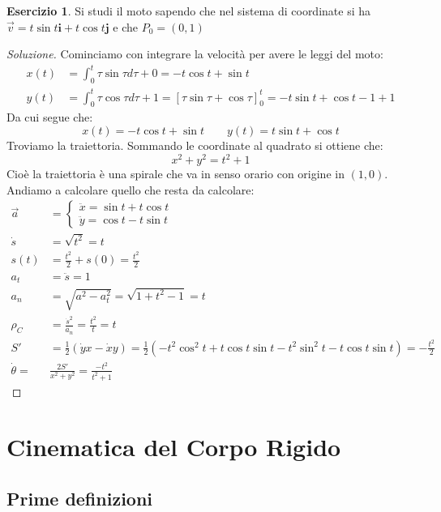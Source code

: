 \documentclass[11pt,a4paper,twoside]{article}
\theoremstyle{definition}
\newtheorem{ese}{Esercizio}[section]
\newenvironment{sol}
	{\renewcommand\qedsymbol{$\blacksquare$}\begin{proof}[Soluzione]}
	{\end{proof}}
\begin{document}
\begin{ese}
	Si studi il moto sapendo che nel sistema di coordinate si ha $\vec v = t \sin t \mathbf i + t \cos t \mathbf j$ e che $P_0 = (0,1)$
\end{ese}

\begin{sol}
	Cominciamo con integrare la velocità per avere le leggi del moto:
	\begin{align*}
		x(t) &= \int_0^t \tau \sin \tau d \tau + 0 = -t \cos t + \sin t\\
		y(t) &= \int_0^t \tau \cos \tau d \tau + 1 = [\tau \sin \tau + \cos \tau]_0^t = -t \sin t + \cos t -1 +1
	\end{align*}
	Da cui segue che:
	\[ x(t) = -t \cos t + \sin t\qquad y(t) = t \sin t + \cos t \]
	Troviamo la traiettoria. Sommando le coordinate al quadrato si ottiene che:
	\[ x^2 + y^2 = t^2 + 1\]
	Cioè la traiettoria è una spirale che va in senso orario con origine in $(1,0)$.\\
	Andiamo a calcolare quello che resta da calcolare:
	\begin{align*}
		\vec a &= \begin{cases} \ddot x = \sin t + t \cos t\\ \ddot y = \cos t - t \sin t\end{cases}\\
		\dot s &= \sqrt{t^2} = t\\
		s(t) &= \frac{t^2}2 + s(0) = \frac{t^2}2\\
		a_t &= \ddot s = 1\\
		a_n &= \sqrt{a^2-a_t^2} = \sqrt{1 + t^2-1} = t\\
		\rho_C &= \frac{\dot s^2}{a_n} = \frac{t^2}t = t\\
		S' &= \frac 12 (\dot yx - \dot xy)=\frac 12 (-t^2 \cos^2t + t \cos t \sin t - t^2 \sin^2t - t \cos t \sin t)= -\frac{t^2}2\\
		\dot \theta =& \frac{2S'}{x^2 + y^2} = \frac{-t^2}{t^2 + 1}
	\end{align*}
\end{sol}

\newpage

\section{Cinematica del Corpo Rigido}

\subsection{Prime definizioni}
\end{document}
